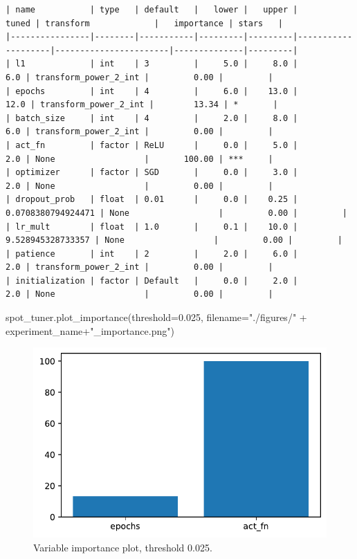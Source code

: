 \documentclass[
  letterpaper,
  DIV=11,
  numbers=noendperiod]{scrreprt}
\newenvironment{Shaded}{\begin{snugshade}}{\end{snugshade}}
\newcommand{\FloatTok}[1]{\textcolor[rgb]{0.68,0.00,0.00}{#1}}
\newcommand{\NormalTok}[1]{\textcolor[rgb]{0.00,0.23,0.31}{#1}}
\newcommand{\OperatorTok}[1]{\textcolor[rgb]{0.37,0.37,0.37}{#1}}
\newcommand{\StringTok}[1]{\textcolor[rgb]{0.13,0.47,0.30}{#1}}
\begin{document}
\begin{verbatim}
| name           | type   | default   |   lower |   upper |              tuned | transform             |   importance | stars   |
|----------------|--------|-----------|---------|---------|--------------------|-----------------------|--------------|---------|
| l1             | int    | 3         |     5.0 |     8.0 |                6.0 | transform_power_2_int |         0.00 |         |
| epochs         | int    | 4         |     6.0 |    13.0 |               12.0 | transform_power_2_int |        13.34 | *       |
| batch_size     | int    | 4         |     2.0 |     8.0 |                6.0 | transform_power_2_int |         0.00 |         |
| act_fn         | factor | ReLU      |     0.0 |     5.0 |                2.0 | None                  |       100.00 | ***     |
| optimizer      | factor | SGD       |     0.0 |     3.0 |                2.0 | None                  |         0.00 |         |
| dropout_prob   | float  | 0.01      |     0.0 |    0.25 | 0.0708380794924471 | None                  |         0.00 |         |
| lr_mult        | float  | 1.0       |     0.1 |    10.0 |  9.528945328733357 | None                  |         0.00 |         |
| patience       | int    | 2         |     2.0 |     6.0 |                2.0 | transform_power_2_int |         0.00 |         |
| initialization | factor | Default   |     0.0 |     2.0 |                2.0 | None                  |         0.00 |         |
\end{verbatim}

\begin{Shaded}
\begin{Highlighting}[]
\NormalTok{spot\_tuner.plot\_importance(threshold}\OperatorTok{=}\FloatTok{0.025}\NormalTok{,}
\NormalTok{    filename}\OperatorTok{=}\StringTok{"./figures/"} \OperatorTok{+}\NormalTok{ experiment\_name}\OperatorTok{+}\StringTok{"\_importance.png"}\NormalTok{)}
\end{Highlighting}
\end{Shaded}

\begin{figure}[H]

{\centering \includegraphics{31_spot_lightning_csv_files/figure-pdf/cell-15-output-1.pdf}

}

\caption{Variable importance plot, threshold 0.025.}

\end{figure}
\end{document}
